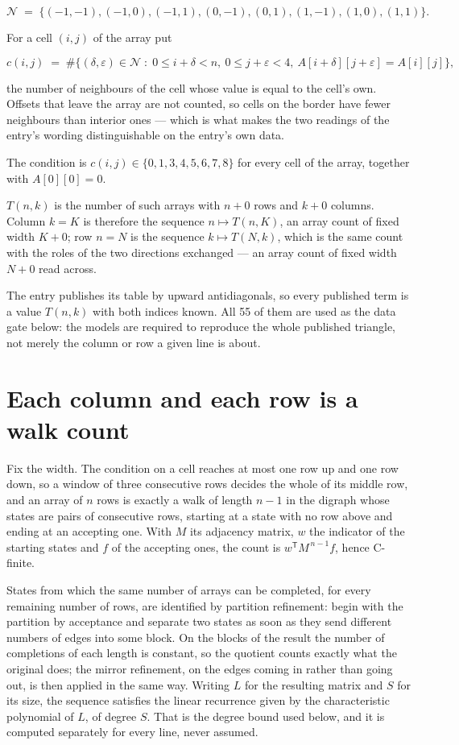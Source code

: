 \documentclass[11pt]{article}
\theoremstyle{definition}
\begin{document}
\[\mathcal{N} \;=\; \{(-1,-1), (-1,0), (-1,1), (0,-1), (0,1), (1,-1), (1,0), (1,1)\}.\]

For a cell $(i,j)$ of the array put

\[c(i,j) \;=\; \#\bigl\{(\delta,\varepsilon)\in\mathcal{N} \;:\; 0\le i+\delta<n,\ 0\le j+\varepsilon<4,\ A[i+\delta][j+\varepsilon] = A[i][j]\bigr\},\]

the number of neighbours of the cell whose value is equal to the cell's own. Offsets that leave the array are not counted, so cells on the border have fewer neighbours than interior ones --- which is what makes the two readings of the entry's wording distinguishable on the entry's own data.

The condition is $c(i,j) \in \{0, 1, 3, 4, 5, 6, 7, 8\}$ for every cell of the array, together with $A[0][0]=0$.

$T(n,k)$ is the number of such arrays with $n + 0$ rows and $k + 0$ columns. Column $k = K$ is therefore the sequence $n \mapsto T(n,K)$, an array count of fixed width $K + 0$; row $n = N$ is the sequence $k \mapsto T(N,k)$, which is the same count with the roles of the two directions exchanged --- an array count of fixed width $N + 0$ read across.

The entry publishes its table by upward antidiagonals, so every published term is a value $T(n,k)$ with both indices known. All 55 of them are used as the data gate below: the models are required to reproduce the whole published triangle, not merely the column or row a given line is about.

\section{Each column and each row is a walk count}

Fix the width. The condition on a cell reaches at most one row up and one row down, so a window of three consecutive rows decides the whole of its middle row, and an array of $n$ rows is exactly a walk of length $n-1$ in the digraph whose states are pairs of consecutive rows, starting at a state with no row above and ending at an accepting one. With $M$ its adjacency matrix, $w$ the indicator of the starting states and $f$ of the accepting ones, the count is $w^{\mathsf T}M^{\,n-1}f$, hence C-finite.

States from which the same number of arrays can be completed, for every remaining number of rows, are identified by partition refinement: begin with the partition by acceptance and separate two states as soon as they send different numbers of edges into some block. On the blocks of the result the number of completions of each length is constant, so the quotient counts exactly what the original does; the mirror refinement, on the edges coming in rather than going out, is then applied in the same way. Writing $L$ for the resulting matrix and $S$ for its size, the sequence satisfies the linear recurrence given by the characteristic polynomial of $L$, of degree $S$. That is the degree bound used below, and it is computed separately for every line, never assumed.
\end{document}
